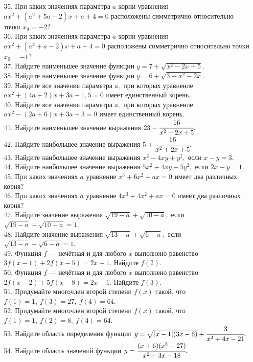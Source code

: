 \documentclass[12pt]{article}
\begin{document}
35. При каких значениях параметра $a$ корни уравнения $ax^2+(a^2+5a-2)x+a+4=0$ расположены симметрично относительно точки $x_0=-2?$\\
36. При каких значениях параметра $a$ корни уравнения $ax^2+(a^2+a-2)x+a+4=0$ расположены симметрично относительно точки $x_0=-1?$\\
37. Найдите наименьшее значение функции $y=7+\sqrt{x^2-2x+5}.$\\
38. Найдите наименьшее значение функции $y=6+\sqrt{3-x^2-2x}.$\\
39. Найдите все значения параметра $a,$ при которых уравнение $ax^2+(4a+2)x+3a+1,5=0$ имеет единственный корень.\\
40. Найдите все значения параметра $a,$ при которых уравнение $ax^2-(2a+6)x+3a+3=0$ имеет единственный корень.\\
41. Найдите наименьшее значение выражения $23-\cfrac{16}{x^2-2x+5}.$\\
42. Найдите наибольшее значение выражения $5+\cfrac{16}{x^2+2x+5}.$\\
43. Найдите наибольшее значение выражения $x^2-4xy+y^2,$ если $x-y=3.$\\
44. Найдите наибольшее значение выражения $5x^2+4xy-5y^2,$ если $2x-y=1.$\\
45. При каких значениях $a$ уравнение $x^3+6x^2+ax=0$ имеет два различных корня?\\
46. При каких значениях $a$ уравнение $4x^3+4x^2+ax=0$ имеет два различных корня?\\
47. Найдите значение выражения $\sqrt{19-a}+\sqrt{10-a},$ если $\sqrt{19-a}-\sqrt{10-a}=1.$\\
48. Найдите значение выражения $\sqrt{13-a}+\sqrt{6-a},$ если $\sqrt{13-a}-\sqrt{6-a}=1.$\\
49. Функция $f$ --- нечётная и для любого $x$ выполнено равенство $3f(x-1)+2f(x-5)=2x+1.$ Найдите $f(2).$\\
50. Функция $f$ --- нечётная и для любого $x$ выполнено равенство $2f(x-2)+5f(x-8)=2x-1.$ Найдите $f(3).$\\
51. Придумайте многочлен второй степени $f(x)$ такой, что $f(1)=1,\ f(3)=27,\ f(4)=64.$\\
52. Придумайте многочлен второй степени $f(x)$ такой, что $f(1)=1,\ f(2)=8,\ f(4)=64.$\\
53. Найдите область определения функции $y=\sqrt{|x-1|(3x-6)}+\cfrac{3}{x^2+4x-21}.$\\
54. Найдите область значений функции $y=\cfrac{(x+6)(x^3-27)}{x^2+3x-18}.$\\
\end{document}
